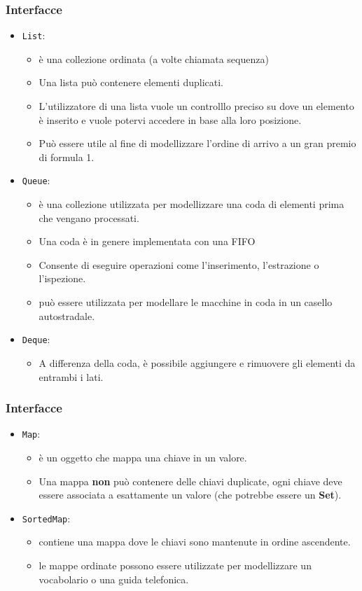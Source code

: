 \documentclass{beamer}
\begin{document}
%
\begin{frame}[fragile]
\frametitle{Interfacce}
\begin{itemize}
\item \texttt{List}: 
\begin{itemize}
\item \`e una collezione ordinata (a volte chiamata sequenza)
\item Una lista pu\`o contenere elementi duplicati. 
\item L'utilizzatore di una lista vuole un controlllo preciso su dove un elemento \`e inserito e vuole potervi accedere in base alla loro posizione. \item Pu\`o essere utile al fine di modellizzare l'ordine di arrivo a un gran premio di formula 1.
\end{itemize} 
\item \texttt{Queue}: 
\begin{itemize}
\item \`e una collezione utilizzata per modellizzare una coda di elementi  prima che vengano processati. 
\item Una coda \`e in genere implementata con una FIFO 
\item Consente di eseguire operazioni come l'inserimento, l'estrazione o l'ispezione. 
\item pu\`o essere utilizzata per modellare le macchine in coda in un casello autostradale.
\end{itemize}
\item \texttt{Deque}: 
\begin{itemize}
\item A differenza della coda, \`e possibile aggiungere e rimuovere gli elementi da entrambi i lati.
\end{itemize} 
\end{itemize}
\end{frame}

\begin{frame}[fragile]
\frametitle{Interfacce}
\begin{itemize}
\item \texttt{Map}:
\begin{itemize}
\item  \`e un oggetto che mappa una chiave in un valore.
\item  Una mappa \textbf{non} pu\`o contenere delle chiavi duplicate, ogni chiave deve essere associata a esattamente un valore (che potrebbe essere un \textbf{Set}). 
\end{itemize}
\item \texttt{SortedMap}:
\begin{itemize}
\item contiene una mappa dove le chiavi sono mantenute in ordine ascendente. 
\item le mappe ordinate possono essere utilizzate per modellizzare un vocabolario o una guida telefonica.
\end{itemize}
\end{itemize}
\end{frame}
\end{document}
